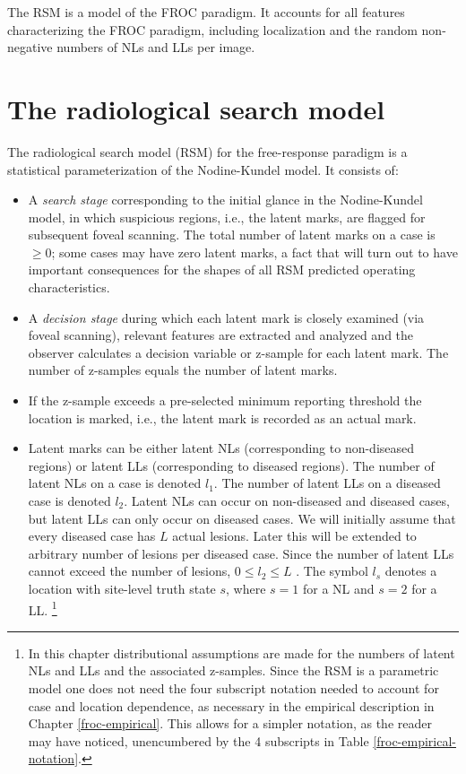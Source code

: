 \documentclass[
]{book}
\begin{document}
The RSM is a model of the FROC paradigm. It accounts for all features characterizing the FROC paradigm, including localization and the random non-negative numbers of NLs and LLs per image.

\hypertarget{rsm-details}{%
\section{The radiological search model}\label{rsm-details}}

The radiological search model (RSM) for the free-response paradigm is a statistical parameterization of the Nodine-Kundel model. It consists of:

\begin{itemize}
\item
  A \emph{search stage} corresponding to the initial glance in the Nodine-Kundel model, in which suspicious regions, i.e., the latent marks, are flagged for subsequent foveal scanning. The total number of latent marks on a case is \(\geq 0\); some cases may have zero latent marks, a fact that will turn out to have important consequences for the shapes of all RSM predicted operating characteristics.
\item
  A \emph{decision stage} during which each latent mark is closely examined (via foveal scanning), relevant features are extracted and analyzed and the observer calculates a decision variable or z-sample for each latent mark. The number of z-samples equals the number of latent marks.
\item
  If the z-sample exceeds a pre-selected minimum reporting threshold the location is marked, i.e., the latent mark is recorded as an actual mark.
\item
  Latent marks can be either latent NLs (corresponding to non-diseased regions) or latent LLs (corresponding to diseased regions). The number of latent NLs on a case is denoted \(l_1\). The number of latent LLs on a diseased case is denoted \(l_2\). Latent NLs can occur on non-diseased and diseased cases, but latent LLs can only occur on diseased cases. We will initially assume that every diseased case has \(L\) actual lesions. Later this will be extended to arbitrary number of lesions per diseased case. Since the number of latent LLs cannot exceed the number of lesions, \(0 \leq l_2 \leq L\) . The symbol \(l_s\) denotes a location with site-level truth state \(s\), where \(s = 1\) for a NL and \(s = 2\) for a LL. \footnote{In this chapter distributional assumptions are made for the numbers of latent NLs and LLs and the associated z-samples. Since the RSM is a parametric model one does not need the four subscript notation needed to account for case and location dependence, as necessary in the empirical description in Chapter \ref{froc-empirical}. This allows for a simpler notation, as the reader may have noticed, unencumbered by the 4 subscripts in Table \ref{froc-empirical-notation}.}
\end{itemize}
\end{document}
